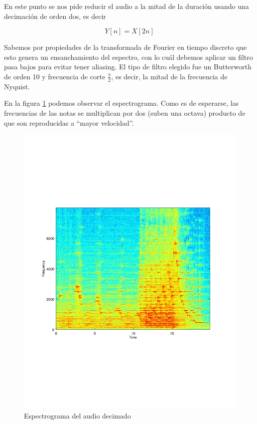 \documentclass[paper=a4, fontsize=11pt]{scrartcl} %
\numberwithin{equation}{section} %
\numberwithin{figure}{section} %
\numberwithin{table}{section} %
\begin{document}
En este punto se nos pide reducir el audio a la mitad de la duración usando una decimación de orden dos, es decir

\begin{equation}
    Y[n] = X[2n]
\end{equation}

Sabemos por propiedades de la transformada de Fourier en tiempo discreto que esto genera un ensanchamiento del espectro, con lo cuál debemos aplicar un filtro pasa bajos para evitar tener aliasing. El tipo de filtro elegido fue un Butterworth de orden 10 y frecuencia de corte $\frac{\pi}{2}$, es decir, la mitad de la frecuencia de Nyquist.

En la figura \ref{audio_decimado} podemos observar el espectrograma. Como es de esperarse, las frecuencias de las notas se multiplican por dos (suben una octava) producto de que son reproducidas a ``mayor velocidad''.


\begin{figure}[t]
\includegraphics[width=\textwidth]{../images/specgram_4_decimated.pdf}
\caption{Espectrograma del audio decimado}
\label{audio_decimado}
\end{figure}
\end{document}

